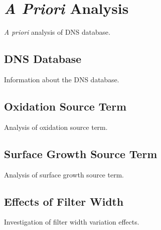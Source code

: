 \section{\textit{A Priori} Analysis}
\label{sec:subfilter:dns}

\textit{A priori} analysis of DNS database.


\subsection{DNS Database}
\label{sec:subfilter:dns:database}

Information about the DNS database.


\subsection{Oxidation Source Term}
\label{sec:subfilter:dns:ox}

Analysis of oxidation source term.


\subsection{Surface Growth Source Term}
\label{sec:subfilter:dns:sg}

Analysis of surface growth source term.


\subsection{Effects of Filter Width}
\label{sec:subfilter:dns:fw}

Investigation of filter width variation effects.


